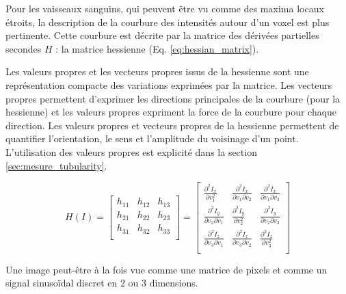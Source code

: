 Pour les vaisseaux sanguins, qui peuvent être vu comme des maxima locaux étroits, la description de la courbure des intensités autour d'un voxel est plus pertinente. Cette courbure est décrite par la matrice des dérivées partielles secondes $H$ : la matrice hessienne (Eq. \ref{eq:hessian_matrix}). 

Les valeurs propres et les vecteurs propres issus de la hessienne sont une représentation compacte des variations exprimées par la matrice. Les vecteurs propres permettent d'exprimer les directions principales de la courbure (pour la hessienne) et les valeurs propres expriment la force de la courbure pour chaque direction.
Les valeurs propres et vecteurs propres de la hessienne permettent de quantifier l'orientation, le sens et l'amplitude du voisinage d'un point. L'utilisation des valeurs propres est explicité dans la section \ref{sec:mesure_tubularity}.

\begin{equation}
  H(I) =
  \begin{bmatrix}
  h_{11} & h_{12} & h_{13} \\
  h_{21} & h_{22} & h_{23} \\
  h_{31} & h_{32} & h_{33} \\
  \end{bmatrix}
    =
  \begin{bmatrix}
  \frac{\partial^2 I_x}{\partial v^2_1} & \frac{\partial^2 I_x}{\partial v_1 \partial v_2} & \frac{\partial^2 I_x}{\partial v_1 \partial v_3} \\
  \frac{\partial^2 I_y}{\partial v_2 \partial v_1} & \frac{\partial^2 I_y}{\partial v^2_2} & \frac{\partial^2 I_y}{\partial v_2 \partial v_3} \\
  \frac{\partial^2 I_z}{\partial v_3 \partial v_1} & \frac{\partial^2 I_z}{\partial v_3 \partial v_2} & \frac{\partial^2 I_z}{\partial v^2_3} \\
  \end{bmatrix}
  \label{eq:hessian_matrix}
\end{equation}


\label{sec:EA:rehaussement:Phase}

Une image peut-être à la fois vue comme une matrice de pixels et comme un signal sinusoïdal discret en 2 ou 3 dimensions. 


